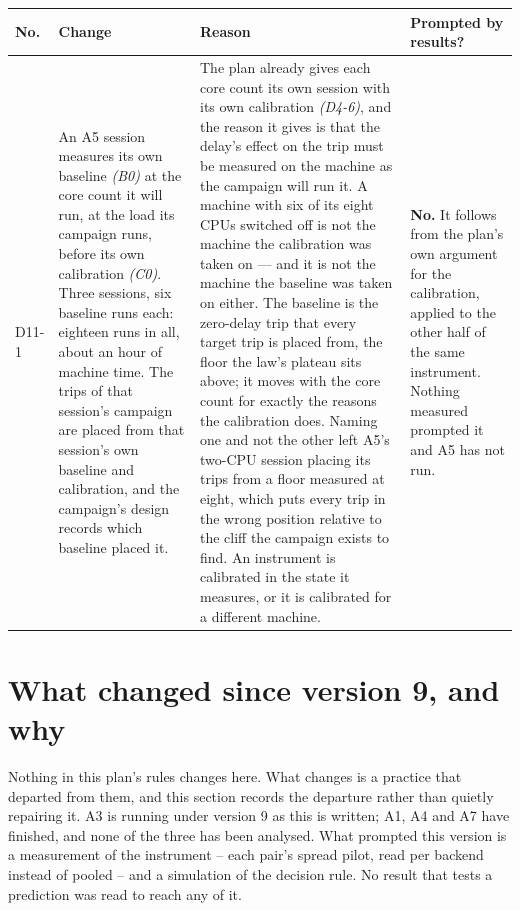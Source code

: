 \documentclass[11pt]{article}
\newcommand{\gl}[1]{{\color{soft}\itshape\small (#1)}}
\begin{document}
{\small
\begin{longtable}{@{}p{1.1cm} >{\raggedright\arraybackslash}p{6.1cm} >{\raggedright\arraybackslash}p{6.0cm} >{\raggedright\arraybackslash}p{2.2cm}@{}}
\toprule
\textbf{No.} & \textbf{Change} & \textbf{Reason} & \textbf{Prompted by results?} \\
\midrule
\endhead
D11-1 & An A5 session measures its own baseline \gl{B0} at the core count it will run, at the load
its campaign runs, before its own calibration \gl{C0}. Three sessions, six baseline runs each:
eighteen runs in all, about an hour of machine time. The trips of that session's campaign are
placed from that session's own baseline and calibration, and the campaign's design records which
baseline placed it. & The plan already gives each core count its own session with its own
calibration \gl{D4-6}, and the reason it gives is that the delay's effect on the trip must be
measured on the machine as the campaign will run it. A machine with six of its eight CPUs switched
off is not the machine the calibration was taken on --- and it is not the machine the baseline was
taken on either. The baseline is the zero-delay trip that every target trip is placed from, the
floor the law's plateau sits above; it moves with the core count for exactly the reasons the
calibration does. Naming one and not the other left A5's two-CPU session placing its trips from a
floor measured at eight, which puts every trip in the wrong position relative to the cliff the
campaign exists to find. An instrument is calibrated in the state it measures, or it is calibrated
for a different machine. & \textbf{No.} It follows from the plan's own argument for the
calibration, applied to the other half of the same instrument. Nothing measured prompted it and
A5 has not run. \\
\bottomrule
\end{longtable}}

\section*{What changed since version 9, and why}
Nothing in this plan's rules changes here. What changes is a practice that departed from them, and
this section records the departure rather than quietly repairing it. A3 is running under version 9
as this is written; A1, A4 and A7 have finished, and none of the three has been analysed. What
prompted this version is a measurement of the instrument -- each pair's spread pilot, read per
backend instead of pooled -- and a simulation of the decision rule. No result that tests a
prediction was read to reach any of it.
\end{document}
